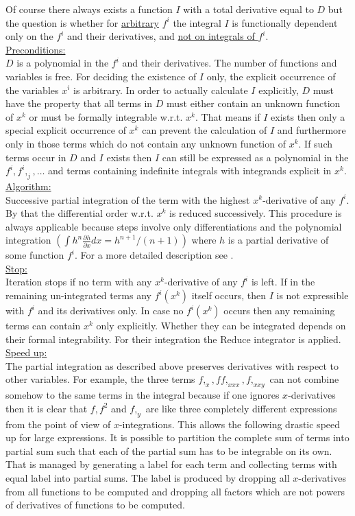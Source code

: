 \documentclass[12pt]{article}
\begin{document}
Of course there
always exists a function $I$ with a total derivative equal to $D$ but
the question is whether for \underline{arbitrary} $f^i$ the integral
$I$ is functionally dependent only on the $f^i$ and their derivatives,
and \underline{not on integrals of $f^i.$} \\
\underline{Preconditions:} \\
$D$ is a polynomial in the $f^i$ and their derivatives. The number of
functions and variables is free. 
For deciding the existence of $I$ only, the explicit occurrence of the
variables $x^i$ is arbitrary. In order to actually
calculate $I$ explicitly, $D$ must have the property that all terms in $D$ 
must either contain an unknown function of $x^k$ or
must be formally integrable w.r.t. $x^k.$
That means if $I$ exists then 
only a special explicit occurrence of $x^k$ can prevent the
calculation of $I$ 
and furthermore only in those terms which do not contain
any unknown function of $x^k.$ 
If such terms occur in $D$ and $I$ exists then $I$ can still be expressed
as a polynomial in the $f^i, f^i,_j, \ldots$ and terms containing 
indefinite integrals with integrands explicit in $x^k.$ \\
\underline{Algorithm:} \\
Successive partial integration of the term with the highest
$x^k$-derivative of any $f^i.$ By that the 
differential order w.r.t. $x^k$ is reduced
successively. This procedure is always applicable because steps involve only
differentiations and the polynomial
integration $(\int h^n\frac{\partial h}{\partial x}dx =
h^{n+1}/(n+1))$ where $h$ is a partial derivative of some function
$f^i.$ For a more detailed description see \cite{WoInt}.\\
\underline{Stop:} \\
Iteration stops if no term with any $x^k$-derivative of any $f^i$ is left.
If in the remaining un-integrated terms any $f^i(x^k)$ itself occurs,
then $I$ is not expressible with $f^i$ and its derivatives only. In
case no $f^i(x^k)$ occurs then any remaining terms can contain $x^k$ only
explicitly. Whether they can be integrated depends on their formal
integrability. For their integration the {\sc Reduce} integrator is
applied. \\
\underline{Speed up:} \\
The partial integration as described above preserves derivatives with
respect to other variables. For example, the three terms $f,_x, f
f,_{xxx}, f,_{xxy}$ can not combine somehow to the same terms in the
integral because if one ignores $x$-derivatives then it is clear that
$f, f^2$ and $f,_y$ are like three completely different expressions
from the point of view of $x$-integrations.
This allows the following drastic speed up
for large expressions. It is possible to partition the complete sum of
terms into partial sum such that each of the partial sum has to be
integrable on its own. That is managed by generating a label for each
term and collecting terms with equal label into partial sums. The
label is produced by dropping all $x$-derivatives from all functions
to be computed and dropping all factors which are not powers of derivatives of
functions to be computed.
\end{document}
